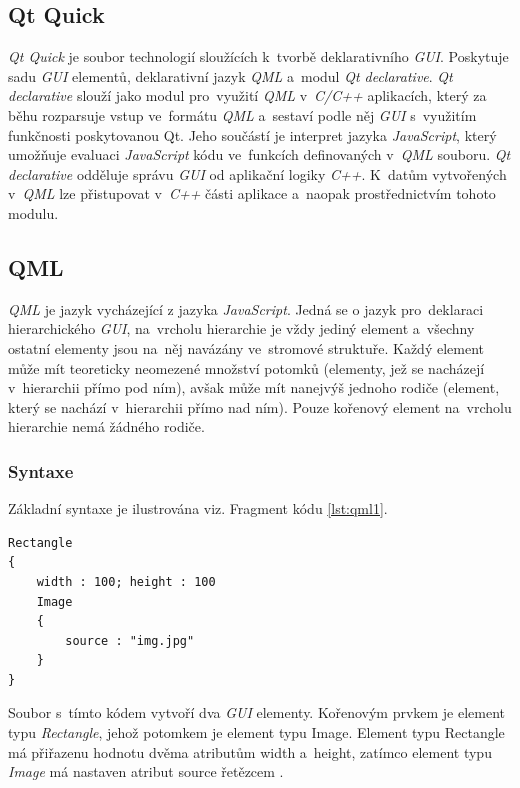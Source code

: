 \documentclass[11pt,twoside,a4paper]{book}
\begin{document}
\subsection{Qt Quick}
\textit{Qt Quick} je soubor technologií sloužících k~tvorbě deklarativního \textit{GUI}. Poskytuje sadu \textit{GUI} elementů, deklarativní jazyk \textit{QML} a~modul \textit{Qt declarative}. \textit{Qt declarative} slouží jako modul pro~využití \textit{QML} v~\textit{C/C++} aplikacích, který za běhu rozparsuje vstup ve~formátu \textit{QML} a~sestaví podle něj \textit{GUI} s~využitím funkčnosti poskytovanou Qt. Jeho součástí je interpret jazyka \textit{JavaScript}, který umožňuje evaluaci \textit{JavaScript} kódu ve~funkcích definovaných v~\textit{QML} souboru. \textit{Qt declarative} odděluje správu \textit{GUI} od aplikační logiky \textit{C++}. K~datům vytvořených v~\textit{QML} lze přistupovat v~\textit{C++} části aplikace a~naopak prostřednictvím tohoto modulu.

\subsection{QML}
\textit{QML} je jazyk vycházející z jazyka \textit{JavaScript}. Jedná se o jazyk pro~deklaraci hierarchického \textit{GUI}, na~vrcholu hierarchie je vždy jediný element a~všechny ostatní elementy jsou na~něj navázány ve~stromové struktuře. Každý element může mít teoreticky neomezené množství potomků (elementy, jež se nacházejí v~hierarchii přímo pod ním), avšak může mít nanejvýš jednoho rodiče (element, který se nachází v~hierarchii přímo nad ním). Pouze kořenový element na~vrcholu hierarchie nemá žádného rodiče.

\subsubsection{Syntaxe}
Základní syntaxe je ilustrována viz. Fragment kódu \ref{lst:qml1}.
\begin{lstlisting}[float,frame=single,caption=Tvorba dvou jednoduchých elementů pomocí jazyka \textit{QML}.,label=Tvorba dvou jednoduchých elementů pomocí jazyka \textit{QML}.,label=lst:qml1]
Rectangle
{
	width : 100; height : 100
	Image
	{
		source : "img.jpg"
	}
}
\end{lstlisting}
Soubor s~tímto kódem vytvoří dva \textit{GUI} elementy. Kořenovým prvkem je element typu \textit{Rectangle}, jehož potomkem je element typu Image. Element typu Rectangle má přiřazenu hodnotu dvěma atributům width a~height, zatímco element typu \textit{Image} má nastaven atribut source řetězcem .
\end{document}
